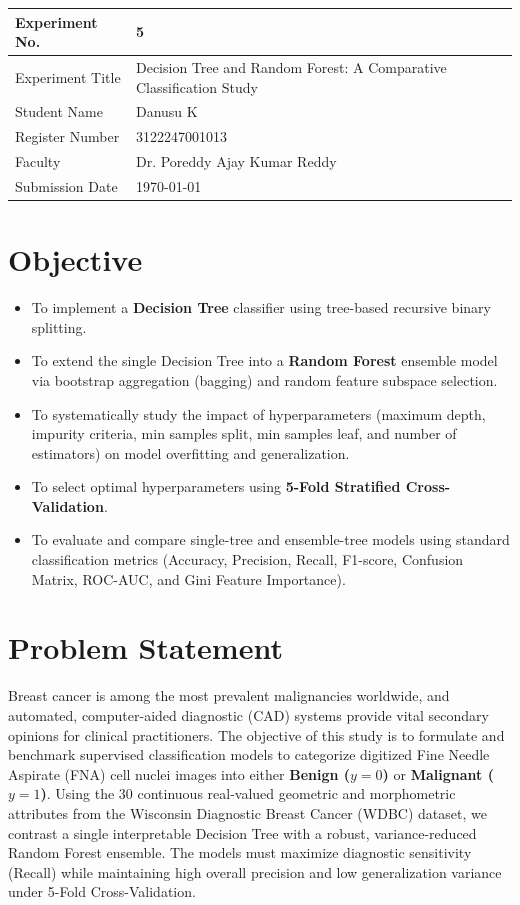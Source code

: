 \documentclass[12pt,a4paper]{article}
\begin{document}
\begin{tabular}{|p{4cm}|p{11cm}|}
\hline
Experiment No. & 5 \\ \hline
Experiment Title & Decision Tree and Random Forest: A Comparative Classification Study\footnotemark \\ \hline
Student Name & Danusu K \\ \hline
Register Number & 3122247001013 \\ \hline
Faculty & Dr. Poreddy Ajay Kumar Reddy \\ \hline
Submission Date & \today \\ \hline
\end{tabular}

\section{Objective}
\begin{itemize}
\item To implement a \textbf{Decision Tree} classifier using tree-based recursive binary splitting.
\item To extend the single Decision Tree into a \textbf{Random Forest} ensemble model via bootstrap aggregation (bagging) and random feature subspace selection.
\item To systematically study the impact of hyperparameters (maximum depth, impurity criteria, min samples split, min samples leaf, and number of estimators) on model overfitting and generalization.
\item To select optimal hyperparameters using \textbf{5-Fold Stratified Cross-Validation}.
\item To evaluate and compare single-tree and ensemble-tree models using standard classification metrics (Accuracy, Precision, Recall, F1-score, Confusion Matrix, ROC-AUC, and Gini Feature Importance).
\end{itemize}

\section{Problem Statement}
Breast cancer is among the most prevalent malignancies worldwide, and automated, computer-aided diagnostic (CAD) systems provide vital secondary opinions for clinical practitioners. The objective of this study is to formulate and benchmark supervised classification models to categorize digitized Fine Needle Aspirate (FNA) cell nuclei images into either \textbf{Benign ($y=0$)} or \textbf{Malignant ($y=1$)}. Using the 30 continuous real-valued geometric and morphometric attributes from the Wisconsin Diagnostic Breast Cancer (WDBC) dataset, we contrast a single interpretable Decision Tree with a robust, variance-reduced Random Forest ensemble. The models must maximize diagnostic sensitivity (Recall) while maintaining high overall precision and low generalization variance under 5-Fold Cross-Validation.
\end{document}
